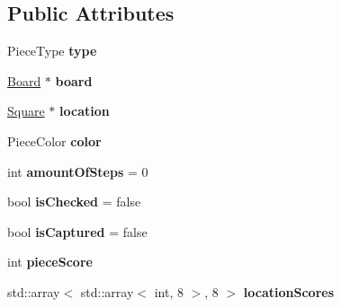 \subsection*{Public Attributes}
\begin{DoxyCompactItemize}
\item 
\mbox{\label{class_chess_piece_a3e2de896951ca2959cd4106150779d79}} 
Piece\+Type {\bfseries type}
\item 
\mbox{\label{class_chess_piece_ae193a49a5fd0430bc047e50801f2077d}} 
\mbox{\hyperlink{class_board}{Board}} $\ast$ {\bfseries board}
\item 
\mbox{\label{class_chess_piece_af82d56d5d5da9afa1e2c2890dda6b29e}} 
\mbox{\hyperlink{class_square}{Square}} $\ast$ {\bfseries location}
\item 
\mbox{\label{class_chess_piece_a19c89a7de4c1936528c11c393480aa1a}} 
Piece\+Color {\bfseries color}
\item 
\mbox{\label{class_chess_piece_a13150134984c3912b61bf19e0b0b0ca3}} 
int {\bfseries amount\+Of\+Steps} = 0
\item 
\mbox{\label{class_chess_piece_a14617579ee81691cb019ce59d2be1289}} 
bool {\bfseries is\+Checked} = false
\item 
\mbox{\label{class_chess_piece_ae4c2a1cf92fa38967b42e17068738f3a}} 
bool {\bfseries is\+Captured} = false
\item 
\mbox{\label{class_chess_piece_afe9c6ae949d443f106617d2e588fe532}} 
int {\bfseries piece\+Score}
\item 
\mbox{\label{class_chess_piece_a55b7732f3c4f7c3636092b05e685d2f6}} 
std\+::array$<$ std\+::array$<$ int, 8 $>$, 8 $>$ {\bfseries location\+Scores}
\end{DoxyCompactItemize}
